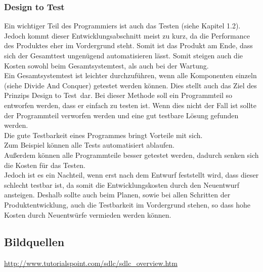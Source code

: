 \documentclass[a4paper, 10pt]{scrartcl}
\begin{document}
\subsubsection{Design to Test}
Ein wichtiger Teil des Programmiers ist auch das Testen (siehe Kapitel 1.2). Jedoch kommt dieser Entwicklungsabschnitt meist zu kurz, da die Performance des Produktes eher im Vordergrund steht. Somit ist das Produkt am Ende, dass sich der Gesamttest ungenügend automatisieren lässt. Somit steigen auch die Kosten sowohl beim Gesamtsystemtest, als auch bei der Wartung.\\
Ein Gesamtsystemtest ist leichter durchzuführen, wenn alle Komponenten einzeln (siehe \glqq Divide And Conquer\grqq) getestet werden können. Dies stellt auch das Ziel des Prinzips \glqq Design to Test\grqq\ dar. Bei dieser Methode soll ein Programmteil so entworfen werden, dass er einfach zu testen ist. Wenn dies nicht der Fall ist sollte der Programmteil verworfen werden und eine gut testbare Lösung gefunden werden.\\
Die gute Testbarkeit eines Programmes bringt Vorteile mit sich.\\
Zum Beispiel können alle Tests automatisiert ablaufen.\\
Außerdem können alle Programmteile besser getestet werden, dadurch senken sich die Kosten für das Testen.\\
Jedoch ist es ein Nachteil, wenn erst nach dem Entwurf feststellt wird, dass dieser schlecht testbar ist, da somit die Entwicklungskosten durch den Neuentwurf ansteigen. Deshalb sollte auch beim Planen, sowie bei allen Schritten der Produktentwicklung, auch die Testbarkeit im Vordergrund stehen, so dass hohe Kosten durch Neuentwürfe vermieden werden können. \citep{goll_entwurfsprinzipien}

\subsection{Bildquellen}
\url{http://www.tutorialspoint.com/sdlc/sdlc_overview.htm}

\newpage

\end{document}
